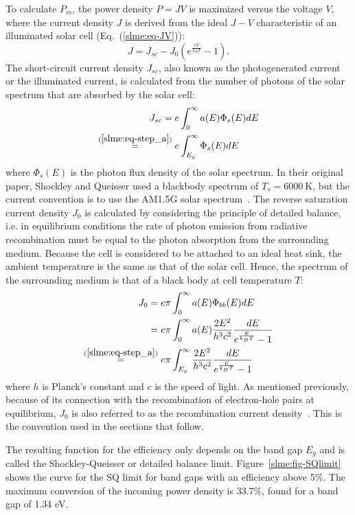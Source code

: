 \begin{refsection}
To calculate $P_m$, the power density $P = JV$ is maximized versus the voltage 
$V$, where the current density $J$ is derived from the ideal $J-V$ 
characteristic of an illuminated solar cell (Eq.~(\ref{slme:eq-JV})): 
\begin{equation}\label{slme:eq-JV} 
J = J_{sc} - J_0 \left(e^{\frac{eV}{k_B T}} - 1\right). 
\end{equation} 
The short-circuit current density $J_{sc}$, also known as the photogenerated 
current or the illuminated current, is calculated from the number of photons 
of the solar spectrum that are absorbed by the solar cell: 
\begin{align} 
J_{sc} = e &\int_0^{\infty} a(E) \Phi_s (E) dE \\ 
\stackrel{(\ref{slme:eq-step_a})}{=} e &\int_{E_g}^{\infty} \Phi_s (E) dE 
\label{slme:eq-Ish} 
\end{align} 
where $\Phi_s(E)$ is the photon flux density of the solar spectrum. In their 
original paper, Shockley and Queisser used a blackbody spectrum of $T_s = 
6000~\si{\kelvin}$, but the current convention is to use the AM1.5G solar 
spectrum~\cite{International2012}.  The reverse saturation current density 
$J_0$ is calculated by considering the principle of detailed balance, i.e. in 
equilibrium conditions the rate of photon emission from radiative 
recombination must be equal to the photon absorption from the surrounding 
medium. Because the cell is considered to be attached to an ideal heat sink, 
the ambient temperature is the same as that of the solar cell. Hence, the 
spectrum of the surrounding medium is that of a black body at cell temperature 
$T$: 
\begin{align} 
J_0 = e \pi &\int_0^{\infty} a(E) \Phi_{bb}(E) dE\nonumber \\ 
= e \pi &\int_0^{\infty} a(E) \frac{2E^2}{h^3 c^2} \frac{dE}{e^{\frac{E}{k_B 
T}}-1} \\ 
\stackrel{(\ref{slme:eq-step_a})}{=} e \pi &\int_{E_g}^{\infty} 
\frac{2E^2}{h^3 c^2} \frac{dE}{e^{\frac{E}{k_B T}}-1} \label{slme:eq-I0} 
\end{align} 
where $h$ is Planck's constant and $c$ is the speed of light. As mentioned previously, because of its 
connection with the recombination of electron-hole pairs at equilibrium, $J_0$ 
is also referred to as the recombination current density~\cite{Cuevas2014}. 
This is the convention used in the sections that follow. 
 
The resulting function for the efficiency only depends on the band gap $E_g$ 
and is called the Shockley-Queisser or detailed balance limit. 
Figure~\ref{slme:fig-SQlimit} shows the curve for the SQ limit for band gaps 
with an efficiency above 5\%. The maximum conversion of the incoming power 
density is 33.7\%, found for a band gap of 1.34 eV. 
 

\end{refsection}
